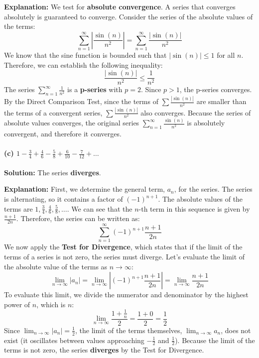 \documentclass[12pt,a4paper]{article}
\theoremstyle{definition}
\theoremstyle{remark}
\begin{document}
\textbf{Explanation:}
We test for \textbf{absolute convergence}. A series that converges absolutely is guaranteed to converge.
Consider the series of the absolute values of the terms:
\[ \sum_{n=1}^{\infty} \left| \frac{\sin(n)}{n^2} \right| = \sum_{n=1}^{\infty} \frac{|\sin(n)|}{n^2} \]
We know that the sine function is bounded such that $|\sin(n)| \le 1$ for all $n$.
Therefore, we can establish the following inequality:
\[ \frac{|\sin(n)|}{n^2} \le \frac{1}{n^2} \]
The series $\displaystyle\sum_{n=1}^{\infty} \frac{1}{n^2}$ is a \textbf{p-series} with $p=2$. Since $p > 1$, the p-series converges.
By the Direct Comparison Test, since the terms of $\sum \frac{|\sin(n)|}{n^2}$ are smaller than the terms of a convergent series, $\sum \frac{|\sin(n)|}{n^2}$ also converges.
Because the series of absolute values converges, the original series $\displaystyle\sum_{n=1}^{\infty} \frac{\sin(n)}{n^2}$ is absolutely convergent, and therefore it converges.


\paragraph{(c) $\displaystyle 1 - \frac{3}{4} + \frac{4}{6} - \frac{5}{8} + \frac{6}{10} - \frac{7}{12} + \dots$}
\textbf{Solution:} The series \textbf{diverges}.

\textbf{Explanation:}
First, we determine the general term, $a_n$, for the series.
The series is alternating, so it contains a factor of $(-1)^{n+1}$.
The absolute values of the terms are $1, \frac{3}{4}, \frac{4}{6}, \frac{5}{8}, \dots$. We can see that the $n$-th term in this sequence is given by $\frac{n+1}{2n}$.
Therefore, the series can be written as:
\[ \sum_{n=1}^{\infty} (-1)^{n+1} \frac{n+1}{2n} \]
We now apply the \textbf{Test for Divergence}, which states that if the limit of the terms of a series is not zero, the series must diverge.
Let's evaluate the limit of the absolute value of the terms as $n \to \infty$:
\[ \lim_{n\to\infty} |a_n| = \lim_{n\to\infty} \left| (-1)^{n+1} \frac{n+1}{2n} \right| = \lim_{n\to\infty} \frac{n+1}{2n} \]
To evaluate this limit, we divide the numerator and denominator by the highest power of $n$, which is $n$:
\[ \lim_{n\to\infty} \frac{1 + \frac{1}{n}}{2} = \frac{1+0}{2} = \frac{1}{2} \]
Since $\lim_{n\to\infty} |a_n| = \frac{1}{2}$, the limit of the terms themselves, $\lim_{n\to\infty} a_n$, does not exist (it oscillates between values approaching $-\frac{1}{2}$ and $\frac{1}{2}$).
Because the limit of the terms is not zero, the series \textbf{diverges} by the Test for Divergence.
\end{document}
